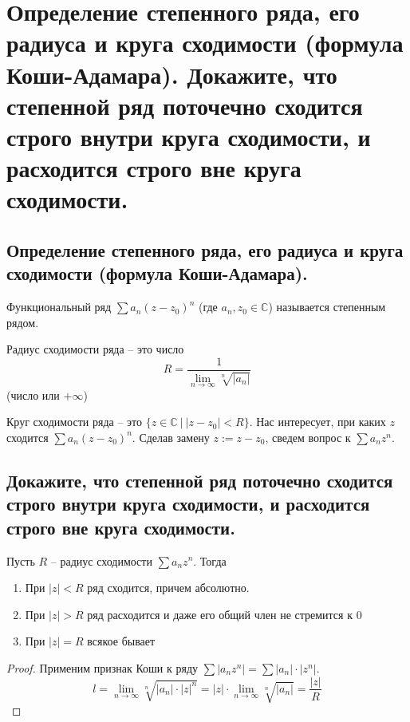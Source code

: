 \section{Определение степенного ряда, его радиуса и круга сходимости (формула Коши-Адамара). Докажите, что степенной ряд поточечно сходится строго внутри круга сходимости, и расходится строго вне круга сходимости.}


\subsection{Определение степенного ряда, его радиуса и круга сходимости (формула Коши-Адамара).}
\begin{definition}
    Функциональный ряд $\sum a_n (z - z_0)^n$ (где $a_n, z_0 \in \mathbb{C}$) называется степенным рядом.
\end{definition}
\begin{definition}
    Радиус сходимости ряда -- это число $$R = \frac{1}{\lim_{n \to \infty} \sqrt[n]{|a_n|}}$$ (число или $+ \infty$)
\end{definition}
\begin{definition}
    Круг сходимости ряда -- это $\{z \in \mathbb{C} \> | \> |z - z_0| < R\}$.
    Нас интересует, при каких $z$ сходится $\sum a_n (z - z_0)^n$. Сделав замену $z := z - z_0$, сведем вопрос к $\sum a_n z^n$.
\end{definition}

\subsection{Докажите, что степенной ряд поточечно сходится строго внутри круга сходимости, и расходится строго вне круга сходимости.}
\begin{theorem}\label{sumconvr}
    Пусть $R$ -- радиус сходимости $\sum a_n z^n$. Тогда
    \begin{enumerate}
        \item При $|z| < R$ ряд сходится, причем абсолютно.
        \item При $|z| > R$ ряд расходится и даже его общий член не стремится к 0
        \item При $|z| = R$ всякое бывает
    \end{enumerate}
    \begin{proof}
        Применим признак Коши к ряду $\sum |a_n z^n| = \sum |a_n| \cdot |z^n|$.
        \[
            l = \lim_{n \to \infty} \sqrt[n]{|a_n| \cdot |z|^n} = |z| \cdot \lim_{n \to \infty} \sqrt[n]{|a_n|} = \frac{|z|}{R}
        \]
    \end{proof}
\end{theorem}